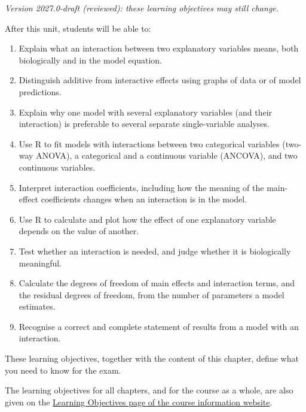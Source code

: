 \documentclass[
  letterpaper,
  8pt,
  a4paper]{book}
\providecommand{\tightlist}{%
  \setlength{\itemsep}{0pt}\setlength{\parskip}{0pt}}
\begin{document}
\begin{tcolorbox}[enhanced jigsaw, arc=.35mm, bottomrule=.15mm, bottomtitle=1mm, breakable, colback=white, colbacktitle=quarto-callout-note-color!10!white, colframe=quarto-callout-note-color-frame, coltitle=black, left=2mm, leftrule=.75mm, opacityback=0, opacitybacktitle=0.6, rightrule=.15mm, title=\textcolor{quarto-callout-note-color}{\faInfo}\hspace{0.5em}{Learning objectives}, titlerule=0mm, toprule=.15mm, toptitle=1mm]

\emph{Version 2027.0-draft (reviewed): these learning objectives may
still change.}

After this unit, students will be able to:

\begin{enumerate}
\def\labelenumi{\arabic{enumi}.}
\tightlist
\item
  Explain what an interaction between two explanatory variables means,
  both biologically and in the model equation.
\item
  Distinguish additive from interactive effects using graphs of data or
  of model predictions.
\item
  Explain why one model with several explanatory variables (and their
  interaction) is preferable to several separate single-variable
  analyses.
\item
  Use R to fit models with interactions between two categorical
  variables (two-way ANOVA), a categorical and a continuous variable
  (ANCOVA), and two continuous variables.
\item
  Interpret interaction coefficients, including how the meaning of the
  main-effect coefficients changes when an interaction is in the model.
\item
  Use R to calculate and plot how the effect of one explanatory variable
  depends on the value of another.
\item
  Test whether an interaction is needed, and judge whether it is
  biologically meaningful.
\item
  Calculate the degrees of freedom of main effects and interaction
  terms, and the residual degrees of freedom, from the number of
  parameters a model estimates.
\item
  Recognise a correct and complete statement of results from a model
  with an interaction.
\end{enumerate}

These learning objectives, together with the content of this chapter,
define what you need to know for the exam.

The learning objectives for all chapters, and for the course as a whole,
are also given on the
\href{https://opetchey.github.io/BIO144_Course_Information/3.1-learning-objectives.html}{Learning
Objectives page of the course information website}.

\end{tcolorbox}
\end{document}
